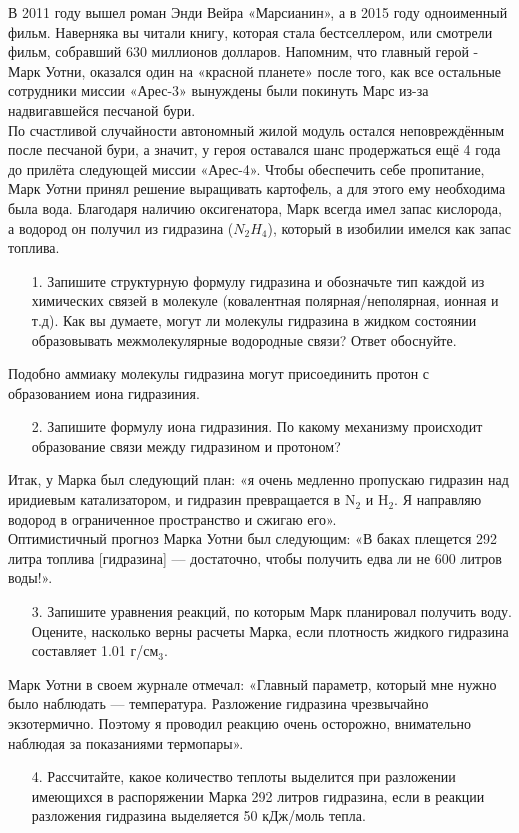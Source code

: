 В 2011 году вышел роман Энди Вейра «Марсианин», а в 2015 году одноименный фильм. Наверняка вы читали книгу, которая стала бестселлером, или смотрели фильм, собравший 630 миллионов долларов. Напомним, что главный герой - Марк Уотни, оказался один на «красной планете» после того, как все остальные сотрудники миссии «Арес-3» вынуждены были покинуть Марс из-за надвигавшейся песчаной бури.\\
По счастливой случайности автономный жилой модуль остался неповреждённым после песчаной бури, а значит, у героя оставался шанс продержаться ещё 4 года до прилёта следующей миссии «Арес-4». Чтобы обеспечить себе пропитание, Марк Уотни принял решение выращивать картофель, а для этого ему необходима была вода. Благодаря наличию оксигенатора, Марк всегда имел запас кислорода, а водород он получил из гидразина ($N_2H_4$), который в изобилии имелся как запас топлива. 
\begin{enumerate}
\item[1.] Запишите структурную формулу гидразина и обозначьте тип каждой из химических связей в молекуле (ковалентная полярная/неполярная, ионная и т.д). Как вы думаете, могут ли молекулы гидразина в жидком состоянии образовывать межмолекулярные водородные связи?  Ответ обоснуйте.
\end{enumerate}
Подобно аммиаку молекулы гидразина могут присоединить протон с образованием иона гидразиния. 
\begin{enumerate}
\item[2.] Запишите формулу иона гидразиния. По какому механизму происходит образование связи между гидразином и протоном?
\end{enumerate}
Итак, у Марка был следующий план: «я очень медленно пропускаю гидразин над иридиевым катализатором, и гидразин превращается в N$_2$ и H$_2$. Я направляю водород в ограниченное пространство и сжигаю его».\\
Оптимистичный прогноз Марка Уотни был следующим: «В баках плещется 292 литра топлива [гидразина] — достаточно, чтобы получить едва ли не 600 литров воды!».
\begin{enumerate}
\item[3.] Запишите уравнения реакций, по которым Марк планировал получить воду. Оцените, насколько верны расчеты Марка, если плотность жидкого гидразина составляет 1.01 г/см$_3$.
\end{enumerate}
Марк Уотни в своем журнале отмечал: «Главный параметр, который мне нужно было наблюдать — температура. Разложение гидразина чрезвычайно экзотермично. Поэтому я проводил реакцию очень осторожно, внимательно наблюдая за показаниями термопары».
\begin{enumerate}
\item[4.] Рассчитайте, какое количество теплоты выделится при разложении имеющихся в распоряжении Марка 292 литров гидразина, если в реакции разложения гидразина выделяется 50 кДж/моль тепла. 
\end{enumerate}


